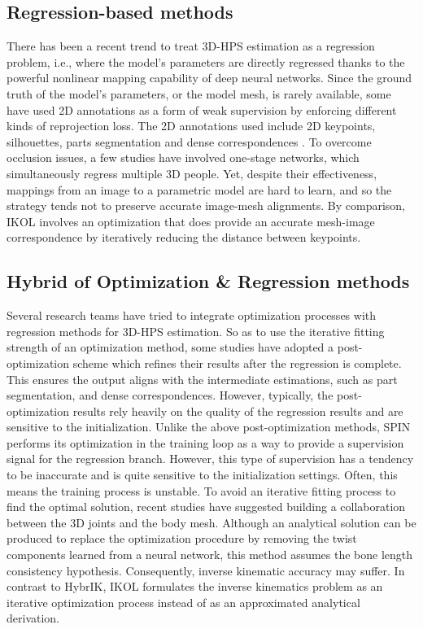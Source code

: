 \documentclass[letterpaper]{article} \usepackage{aaai23}  \usepackage{times}  \usepackage{helvet}  \usepackage{courier}  \usepackage[hyphens]{url}  \usepackage{graphicx} \urlstyle{rm} \def\UrlFont{\rm}  \usepackage{natbib}  \usepackage{caption} \frenchspacing  \setlength{\pdfpagewidth}{8.5in}  \setlength{\pdfpageheight}{11in}  \usepackage{algorithm}
\begin{document}
\subsection{Regression-based methods}
There has been a recent trend to treat 3D-HPS estimation as a regression problem, i.e., where the model’s parameters are directly regressed thanks to the powerful nonlinear mapping capability of deep neural networks. Since the ground truth of the model’s parameters, or the model mesh, is rarely available, some have used 2D annotations as a form of weak supervision by enforcing different kinds of reprojection loss. The 2D annotations used include 2D keypoints\cite{kanazawa2018end,pavlakos2018learning}, silhouettes\cite{pavlakos2018learning, varol2018bodynet}, parts segmentation\cite{omran2018neural, rueegg2020chained} and dense correspondences \cite{xu2019denserac,zhang2020learning}. To overcome occlusion issues, a few studies \cite{zhang2021body,sun2021monocular,sun2022putting, jiang2020coherent} have involved one-stage networks, which simultaneously regress multiple 3D people. Yet, despite their effectiveness, mappings from an image to a parametric model are hard to learn, and so the strategy tends not to preserve accurate image-mesh alignments. By comparison, IKOL involves an optimization that does provide an accurate mesh-image correspondence by iteratively reducing the distance between keypoints. 

\subsection{Hybrid of Optimization \& Regression methods}
Several research teams have tried to integrate optimization processes with regression methods for 3D-HPS estimation. So as to use the iterative fitting strength of an optimization method, some studies have adopted a post-optimization scheme which refines their results after the regression is complete. This ensures the output aligns with the intermediate estimations, such as part segmentation\cite{zanfir2021neural}, and dense correspondences\cite{guler2019holopose}. However, typically, the post-optimization results rely heavily on the quality of the regression results and are sensitive to the initialization. Unlike the above post-optimization methods, SPIN \cite{kolotouros2019learning} performs its optimization in the training loop as a way to provide a supervision signal for the regression branch. However, this type of supervision has a tendency to be inaccurate and is quite sensitive to the initialization settings. Often, this means the training process is unstable. To avoid an iterative fitting process to find the optimal solution, recent studies \cite{li2021hybrik, moon2020i2l, yu2021skeleton2mesh} have suggested building a collaboration between the 3D joints and the body mesh. Although an analytical solution can be produced to replace the optimization procedure by removing the twist components learned from a neural network, this method assumes the bone length consistency hypothesis. Consequently, inverse kinematic accuracy may suffer. In contrast to HybrIK, IKOL formulates the inverse kinematics problem as an iterative optimization process instead of as an approximated analytical derivation. 
\end{document}
